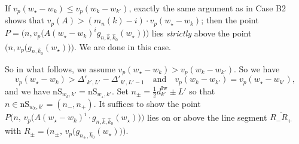 \documentclass[12pt]{amsart}
\theoremstyle{definition}
\numberwithin{equation}{subsection}
\newcommand{\Iw}{\mathrm{Iw}}
\newcommand{\nS}{\mathrm{nS}}
\begin{document}
If $v_p(w_\star-w_k) \leq v_p(w_k-w_{k'})$, exactly the same argument as in Case B2 shows that $v_p(A) > (m_n(k)-i) \cdot v_p(w_\star-w_k)$; then the point $P = \big(n,v_p\big(A(w_\star-w_k)^ig_{n,\hat{ k},\hat{ k}_0}(w_\star)\big)\big)$ lies \emph{strictly} above the point $\big(n, v_p\big( g_{n,\hat{k}_0}(w_\star)\big) \big)$. We are done in this case.

So in what follows, we assume $v_p(w_\star-w_k) > v_p(w_k-w_{k'})$. So we have 
\begin{equation}
\label{E:vpwk-wk' = vpwstar -wk'}
v_p(w_\star - w_k) > \Delta'_{k', L'} - \Delta'_{k',L'-1} \quad \textrm{and} \quad v_p(w_k-w_{k'}) = v_p(w_\star -w_{k'}),
\end{equation}
and we have $\nS_{w_k,k'}=\nS_{w_\star,k'}$. Set $n_\pm=\frac 12 d_{k'}^\Iw\pm L'$ so that $n\in \nS_{w_k,k'}=(n_-,n_+)$. It suffices to show the point $P\big( n,\, v_p\big(A(w_\star-w_k)^i\cdot g_{n,\hat{k}, \hat k_0}(w_\star)\big)\big) $ lies on or above the line segment $\overline {R_-R_+}$ with $R_\pm=\big(n_\pm, \,v_p\big(g_{n_\pm,\hat{k}_0}(w_\star) \big) \big)$. 
\end{document}
